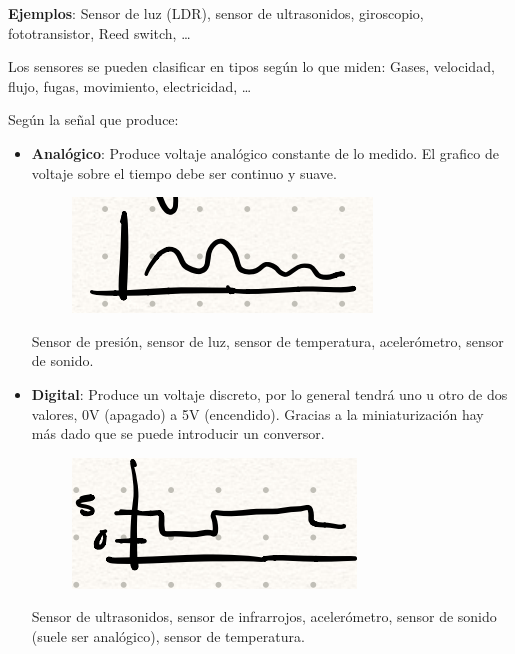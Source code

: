 \documentclass[12pt]{report} %
\begin{document}
\textbf{Ejemplos}: Sensor de luz (LDR), sensor de ultrasonidos,
giroscopio, fototransistor, Reed switch, \ldots{}

Los sensores se pueden clasificar en tipos según lo que miden: Gases,
velocidad, flujo, fugas, movimiento, electricidad, \ldots{}

Según la señal que produce:

\begin{itemize}

\item
  \textbf{Analógico}: Produce voltaje analógico constante de lo medido.
  El grafico de voltaje sobre el tiempo debe ser continuo y suave.

\begin{figure}[H]
	{\includegraphics[scale=.5]{image-20210307210139988.png}}
\end{figure}

    Sensor de presión, sensor de luz, sensor de temperatura,
    acelerómetro, sensor de sonido.

\item
  \textbf{Digital}: Produce un voltaje discreto, por lo general tendrá
  uno u otro de dos valores, 0V (apagado) a 5V (encendido). Gracias a la
  miniaturización hay más dado que se puede introducir un conversor.

\begin{figure}[H]
	{\includegraphics[scale=.5]{image-20210307210421078.png}}
\end{figure}

    Sensor de ultrasonidos, sensor de infrarrojos, acelerómetro, sensor
    de sonido (suele ser analógico), sensor de temperatura.
\end{itemize}
\end{document}
